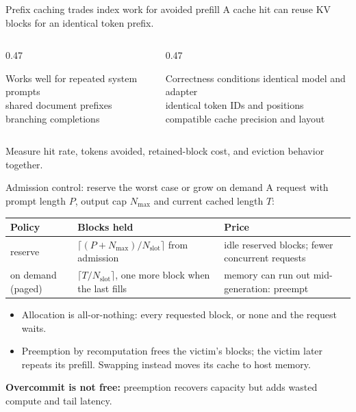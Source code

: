 \documentclass[handout]{beamer}
\begin{document}
\begin{frame}{Prefix caching trades index work for avoided prefill}
  A cache hit can reuse KV blocks for an identical token prefix.
  \begin{columns}[t]
    \begin{column}{0.47\linewidth}
      \begin{block}{Works well for}
        repeated system prompts\\shared document prefixes\\branching completions
      \end{block}
    \end{column}
    \begin{column}{0.47\linewidth}
      \begin{alertblock}{Correctness conditions}
        identical model and adapter\\identical token IDs and positions\\compatible cache precision and layout
      \end{alertblock}
    \end{column}
  \end{columns}
  Measure hit rate, tokens avoided, retained-block cost, and eviction behavior together.
\end{frame}

\begin{frame}{Admission control: reserve the worst case or grow on demand}
  \small
  A request with prompt length $P$, output cap $N_{\max}$ and current cached length $T$:
  \begin{center}
    \begin{tabular}{@{}>{\raggedright\arraybackslash}p{.17\linewidth}>{\raggedright\arraybackslash}p{.30\linewidth}>{\raggedright\arraybackslash}p{.44\linewidth}@{}}
      \toprule
      Policy & Blocks held & Price \\
      \midrule
      reserve & $\lceil (P+N_{\max})/N_{\text{slot}}\rceil$ from admission & idle reserved blocks; fewer concurrent requests \\
      \addlinespace[3pt]
      on demand (paged) & $\lceil T/N_{\text{slot}}\rceil$, one more block when the last fills & memory can run out mid-generation: preempt \\
      \bottomrule
    \end{tabular}
  \end{center}
  \begin{itemize}
      \setlength{\itemsep}{3pt}
    \item Allocation is all-or-nothing: every requested block, or none and the request waits.
    \item Preemption by recomputation frees the victim's blocks; the victim later repeats its prefill. Swapping instead moves its cache to host memory.
  \end{itemize}
  \vspace{2pt}
  \textbf{\textcolor{signaldark}{Overcommit is not free:}} preemption recovers capacity but adds wasted compute and tail latency.
\end{frame}
\end{document}
